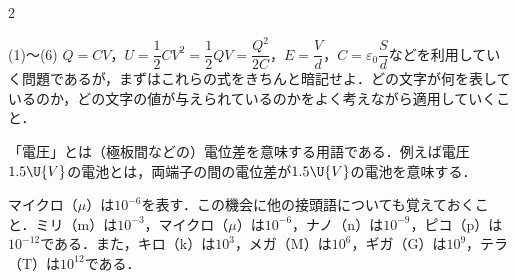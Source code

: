 \newpage

\setlength{\columnseprule}{0.4pt}
\begin{multicols}{2}
\raggedcolumns

\par\nopagebreak
\begin{sisin}
(1)〜(6) $Q=CV$，$U=\dfrac{1}{2}CV^2=\dfrac{1}{2}QV=\dfrac{Q^2}{2C}$，$E=\dfrac{V}{d}$，$C=\varepsilon_0\dfrac{S}{d}$などを利用していく問題であるが，まずはこれらの式をきちんと暗記せよ．どの文字が何を表しているのか，どの文字の値が与えられているのかをよく考えながら適用していくこと．

「電圧」とは（極板間などの）電位差を意味する用語である．例えば電圧$1.5\U{V}$の電池とは，両端子の間の電位差が$1.5\U{V}$の電池を意味する．

マイクロ（$\mu$）は$10^{-6}$を表す．この機会に他の接頭語についても覚えておくこと．ミリ（m）は$10^{-3}$，マイクロ（$\mu$）は$10^{-6}$，ナノ（n）は$10^{-9}$，ピコ（p）は$10^{-12}$である．また，キロ（k）は$10^{3}$，メガ（M）は$10^{6}$，ギガ（G）は$10^{9}$，テラ（T）は$10^{12}$である．


\end{sisin}
\end{multicols}
